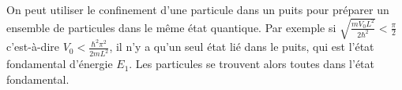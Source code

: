 \documentclass[12pt,fancy]{cours}
\begin{document}
%
%

\begin{remarque}
On peut utiliser le confinement d'une particule dans un puits pour préparer un ensemble de particules dans le même état quantique. Par exemple si $\sqrt{\frac{mV_0 L^2}{2\hbar^2}}<\frac{\pi}{2}$ c'est-à-dire $V_0<\frac{\hbar^2\pi^2}{2mL^2}$, il n'y a qu'un seul état lié dans le puits, qui est l'état fondamental d'énergie $E_1$. Les particules se trouvent alors toutes dans l'état fondamental.
\end{remarque}
\end{document}
